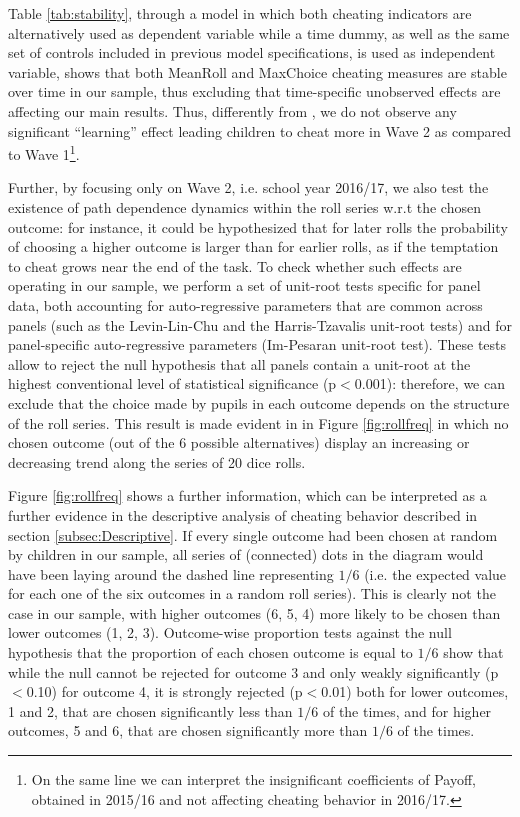 \documentclass[authoryear, preprint, review, 12pt]{elsarticle}
\begin{document}
Table \ref{tab:stability}, through a model in which both cheating indicators are alternatively used as dependent variable while a time dummy, as well as the same set of controls included in previous model specifications, is used as independent variable, shows that both MeanRoll and MaxChoice cheating measures are stable over time in our sample, thus excluding that time-specific unobserved effects are affecting our main results. Thus, differently from \cite{ff13}, we do not observe any significant \enquote{learning} effect leading children to cheat more in Wave 2 as compared to Wave 1\footnote{On the same line we can interpret the insignificant coefficients of Payoff, obtained in 2015/16 and not affecting cheating behavior in 2016/17.}.



Further, by focusing only on Wave 2, i.e. school year 2016/17, we also test the existence of path dependence dynamics within the roll series w.r.t the chosen outcome: for instance, it could be hypothesized that for later rolls the probability of choosing a higher outcome is larger than for earlier rolls, as if the temptation to cheat grows near the end of the task. To check whether such effects are operating in our sample, we perform a set of unit-root tests specific for panel data, both accounting for auto-regressive parameters that are common across panels (such as the Levin-Lin-Chu and the Harris-Tzavalis unit-root tests) and for panel-specific auto-regressive parameters (Im-Pesaran unit-root test). These tests allow to reject the null hypothesis that all panels contain a unit-root at the highest conventional level of statistical significance (p$<$0.001): therefore, we can exclude that the choice made by pupils in each outcome depends on the structure of the roll series. This result is made evident in in Figure \ref{fig:rollfreq} in which no chosen outcome (out of the 6 possible alternatives) display an increasing or decreasing trend along the series of 20 dice rolls.  

Figure \ref{fig:rollfreq} shows a further information, which can be interpreted as a further evidence in the descriptive analysis of cheating behavior described in section \ref{subsec:Descriptive}. If every single outcome had been chosen at random by children in our sample, all series of (connected) dots in the diagram would have been laying around the dashed line representing $1/6$ (i.e. the expected value for each one of the six outcomes in a random roll series). This is clearly not the case in our sample, with higher outcomes (6, 5, 4) more likely to be chosen than lower outcomes (1, 2, 3). Outcome-wise proportion tests against the null hypothesis that the proportion of each chosen outcome is equal to $1/6$ show that while the null cannot be rejected for outcome 3 and only weakly significantly (p$<$0.10) for outcome 4, it is strongly rejected (p$<$0.01) both for lower outcomes, 1 and 2, that are chosen significantly less than $1/6$ of the times, and for higher outcomes, 5 and 6, that are chosen significantly more than $1/6$ of the times.
\end{document}
